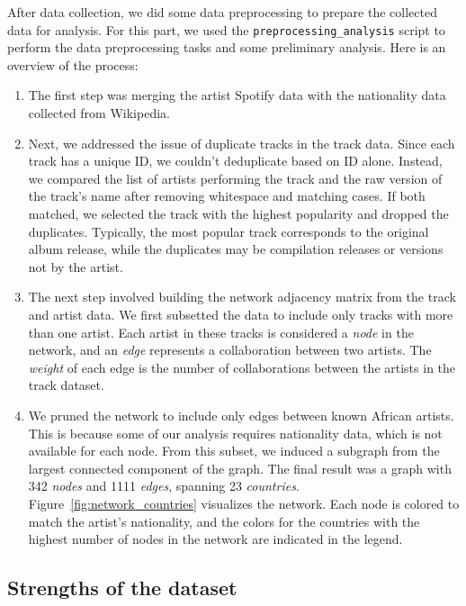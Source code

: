 \documentclass{article}
\begin{document}
After data collection, we did some data preprocessing to prepare the collected
data for analysis. For this part, we used the \texttt{preprocessing\_analysis}
script to perform the data preprocessing tasks and some preliminary analysis.
Here is an overview of the process:

\begin{enumerate}
    \item The first step was merging the artist Spotify data with the nationality data
          collected from Wikipedia.
    \item Next, we addressed the issue of duplicate tracks in the track data. Since each
          track has a unique ID, we couldn't deduplicate based on ID alone. Instead, we
          compared the list of artists performing the track and the raw version of the
          track's name after removing whitespace and matching cases. If both matched, we
          selected the track with the highest popularity and dropped the duplicates.
          Typically, the most popular track corresponds to the original album release,
          while the duplicates may be compilation releases or versions not by the artist.
    \item The next step involved building the network adjacency matrix from the track and
          artist data. We first subsetted the data to include only tracks with more than
          one artist. Each artist in these tracks is considered a \textit{node} in the
          network, and an \textit{edge} represents a collaboration between two artists.
          The \textit{weight} of each edge is the number of collaborations between the
          artists in the track dataset.
    \item We pruned the network to include only edges between known African artists. This
          is because some of our analysis requires nationality data, which is not
          available for each node. From this subset, we induced a subgraph from the
          largest connected component of the graph. The final result was a graph with 342
          \textit{nodes} and 1111 \textit{edges}, spanning 23 \textit{countries}. Figure\
          \ref{fig:network_countries} visualizes the network. Each node is colored to
          match the artist’s nationality, and the colors for the countries with the
          highest number of nodes in the network are indicated in the legend.
\end{enumerate}

\subsection{Strengths of the dataset}
\end{document}
